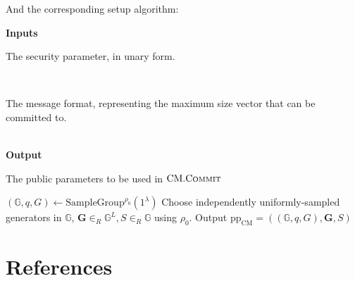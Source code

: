 \documentclass[
]{article}
\newcommand{\Desc}[2]{\hspace*{\algorithmicindent} \makebox[14.5em][l]{#1}\parbox[t]{32em}{#2}}
\newcommand*\Nb{\mathbb{N}}
\newcommand*\Gb{\mathbb{G}}
\renewcommand*\l{\lambda}
\renewcommand{\vec}[1]{ \boldsymbol{#1} }
\newcommand*{\from}{\gets}
\newcommand*{\pp}{\mathrm{pp}}
\newcommand*{\Setup}{\mathrm{\text{S{\scriptsize ETUP}}}}
\newcommand*{\Commit}{\mathrm{\text{C{\scriptsize OMMIT}}}}
\newcommand*{\CM}{\mathrm{\text{CM}}}
\newcommand*{\CMSetup}{\CM.\Setup}
\newcommand*{\CMCommit}{\CM.\Commit}
\begin{document}
And the corresponding setup algorithm:

\begin{algorithm}[H]
\caption{$\CMSetup^{\rho_0}$}
\textbf{Inputs} \\
  \Desc{$\l: \Nb$}{The security parameter, in unary form.} \\
  \Desc{$L: \Nb$}{The message format, representing the maximum size vector that can be committed to.} \\
\textbf{Output} \\
  \Desc{$\pp_\CM$}{The public parameters to be used in $\CMCommit$}
\begin{algorithmic}[1]
  \State $(\Gb, q, G) \from \text{SampleGroup}^{\rho_0}(1^\l)$
  \State Choose independently uniformly-sampled generators in $\Gb$, $\vec{G} \in_R \Gb^L, S \in_R \Gb$ using $\rho_0$.
  \State Output $\pp_\CM = ((\Gb, q, G), \vec{G}, S)$
\end{algorithmic}
\end{algorithm}

\newpage

\section*{References}\label{references}
\end{document}
